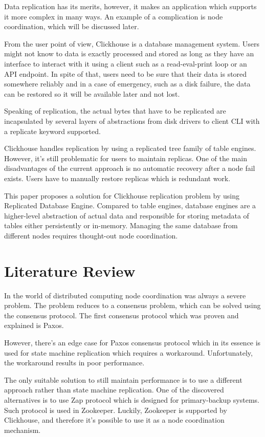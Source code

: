 \documentclass[conference]{IEEEtran}
\begin{document}
Data replication has its merits, however, it makes an application which supports it more
complex in many ways.
An example of a complication is node coordination, which will be discussed later.

From the user point of view, Clickhouse is a database management system.
Users might not know to data is exactly processed and stored as long as they have
an interface to interact with it using a client such as a read-eval-print loop or an API endpoint.
In spite of that, users need to be sure that their data is stored somewhere
reliably and in a case of emergency, such as a disk failure, the data can be restored so it will be
available later and not lost.

Speaking of replication, the actual bytes that have to be replicated are incapsulated
by several layers of abstractions from disk drivers to client CLI with a replicate
keyword supported.

Clickhouse handles replication by using a replicated tree family of table engines.
However, it's still problematic for users to maintain replicas. One of the
main disadvantages of the current approach is no automatic recovery after a node fail exists.
Users have to manually restore replicas which is redundant work.

This paper proposes a solution for Clickhouse replication problem by using Replicated
Database Engine. Compared to table engines, database engines are a higher-level abstraction
of actual data and responsible for storing metadata of tables either persistently or
in-memory. Managing the same database from different nodes requires thought-out node coordination.

\section{Literature Review}
In the world of distributed computing node coordination was
always a severe problem. The problem reduces to a consensus
problem, which can be solved using the consensus protocol. The first consensus
protocol which was proven and explained is Paxos\cite{paxos}.

However, there's an edge case for Paxos consensus protocol which in its essence is used for
state machine replication which requires a workaround\cite{zap}. Unfortunately, the workaround
results in poor performance. 

The only suitable solution to still maintain performance is to use a different approach
rather than state machine replication. One of the discovered alternatives is to use
Zap protocol which is designed for primary-backup systems. Such protocol is used in
Zookeeper\cite{zookeeper}. Luckily, Zookeeper is supported by Clickhouse, and therefore
it's possible to use it as a node coordination mechanism.
\end{document}
